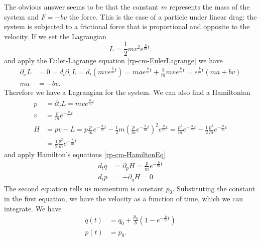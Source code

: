 The obvious answer seems to be that the constant $m$ represents the mass of the system and $F = -bv$ the force. This is the case of a particle under linear drag:  the system is subjected to a frictional force that is proportional and opposite to the velocity. If we set the Lagrangian
\begin{equation}\label{rp-cm-frictionLagrangian}
	L = \frac{1}{2} m v^2 e^{\frac{b}{m}t}.
\end{equation}
and apply the Euler-Lagrange equation \ref{rp-cm-EulerLagrange} we have
\begin{equation}
	\begin{aligned}
	\partial_x L &= 0 = d_t \partial_v L = d_t \left(m v e^{\frac{b}{m}t} \right)=mae^{\frac{b}{m}t} + \frac{b}{m} m v e^{\frac{b}{m}t} = e^{\frac{b}{m}t}(ma + bv) \\
	ma &= - bv.
	\end{aligned}
\end{equation}
Therefore we have a Lagrangian for the system. We can also find a Hamiltonian
\begin{equation}\label{rp-cm-kd-momentumHamiltonian}
	\begin{aligned}
	p &= \partial_v L = m v e^{\frac{b}{m}t} \\
		v &= \frac{p}{m} e^{-\frac{b}{m}t} \\
		H &= p v - L = p \frac{p}{m} e^{-\frac{b}{m}t} - \frac{1}{2} m \left( \frac{p}{m} e^{-\frac{b}{m}t} \right)^2 e^{\frac{b}{m}t} = \frac{p^2}{m}  e^{-\frac{b}{m}t} - \frac{1}{2} \frac{p^2}{m}  e^{-\frac{b}{m}t} \\ 
		&=\frac{1}{2} \frac{p^2}{m}  e^{-\frac{b}{m}t}
	\end{aligned}
\end{equation}
and apply Hamilton's equations \ref{rp-cm-HamiltonEq}
\begin{equation}
	\begin{aligned}
		d_t q &= \partial_p H = \frac{p}{m}  e^{-\frac{b}{m}t} \\
		d_t p &= - \partial_q H = 0. 
	\end{aligned}
\end{equation}
The second equation tells us momentum is constant $p_0$. Substituting the constant in the first equation, we have the velocity as a function of time, which we can integrate. We have
\begin{equation}
	\begin{aligned}
	q(t) &= q_0 + \frac{p_0}{b} \left( 1 - e^{-\frac{b}{m}t}\right) \\
	p(t) &= p_0.
	\end{aligned}
\end{equation}

